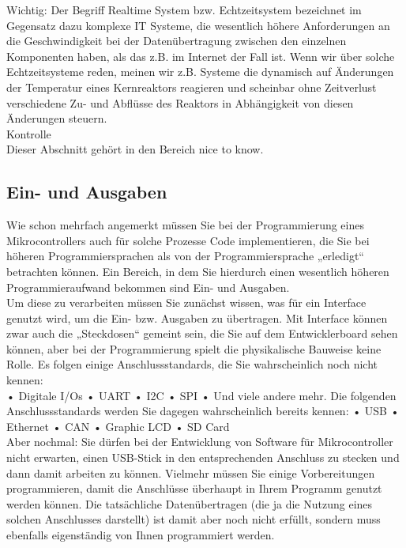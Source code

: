 Wichtig: Der Begriff Realtime System bzw. Echtzeitsystem bezeichnet im Gegensatz dazu komplexe IT Systeme, die wesentlich höhere Anforderungen an die Geschwindigkeit bei der Datenübertragung zwischen den einzelnen Komponenten haben, als das z.B. im Internet der Fall ist. Wenn wir über solche Echtzeitsysteme reden, meinen wir z.B. Systeme die dynamisch auf Änderungen der Temperatur eines Kernreaktors reagieren und scheinbar ohne Zeitverlust verschiedene Zu- und Abflüsse des Reaktors in Abhängigkeit von diesen Änderungen steuern.\\

Kontrolle\\

Dieser Abschnitt gehört in den Bereich nice to know.

\subsection{Ein- und Ausgaben}

Wie schon mehrfach angemerkt müssen Sie bei der Programmierung eines Mikrocontrollers auch für solche Prozesse Code implementieren, die Sie bei höheren Programmiersprachen als von der Programmiersprache „erledigt“ betrachten können. Ein Bereich, in dem Sie hierdurch einen wesentlich höheren Programmieraufwand bekommen sind Ein- und Ausgaben.\\

Um diese zu verarbeiten müssen Sie zunächst wissen, was für ein Interface genutzt wird, um die Ein- bzw. Ausgaben zu übertragen. Mit Interface können zwar auch die „Steckdosen“ gemeint sein, die Sie auf dem Entwicklerboard sehen können, aber bei der Programmierung spielt die physikalische Bauweise keine Rolle. Es folgen einige Anschlussstandards, die Sie wahrscheinlich noch nicht kennen:\\

•	Digitale I/Os
•	UART
•	I2C
•	SPI
•	Und viele andere mehr.
Die folgenden Anschlussstandards werden Sie dagegen wahrscheinlich bereits kennen:
•	USB
•	Ethernet
•	CAN
•	Graphic LCD
•	SD Card\\

Aber nochmal: Sie dürfen bei der Entwicklung von Software für Mikrocontroller nicht erwarten, einen USB-Stick in den entsprechenden Anschluss zu stecken und dann damit arbeiten zu können. Vielmehr müssen Sie einige Vorbereitungen programmieren, damit die Anschlüsse überhaupt in Ihrem Programm genutzt werden können. Die tatsächliche Datenübertragen (die ja die Nutzung eines solchen Anschlusses darstellt) ist damit aber noch nicht erfüllt, sondern muss ebenfalls eigenständig von Ihnen programmiert werden.

